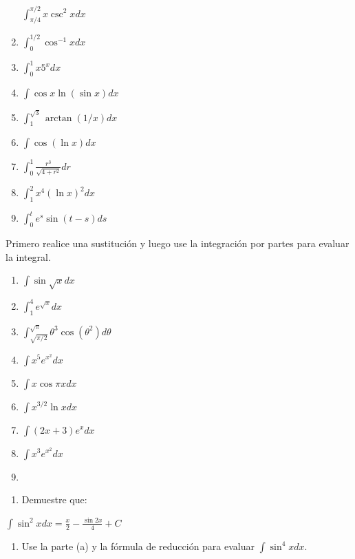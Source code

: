 \documentclass[12pt,]{article}
\providecommand{\tightlist}{%
  \setlength{\itemsep}{0pt}\setlength{\parskip}{0pt}}
\begin{document}
\begin{enumerate}
  \(\displaystyle\int_{\pi/4}^{\pi/2}x\csc^2xdx\)
\item
  \(\displaystyle\int_0^{1/2}\cos^{-1}x dx\)
\item
  \(\displaystyle\int_0^1x5^xdx\)
\item
  \(\displaystyle\int\cos x \ln(\sin x)dx\)
\item
  \(\displaystyle\int_1^{\sqrt{3}}\arctan(1/x)dx\)
\item
  \(\displaystyle\int\cos(\ln x)dx\)
\item
  \(\displaystyle\int_0^1\frac{r^3}{\sqrt{4+r^2}}dr\)
\item
  \(\displaystyle\int_1^2x^4(\ln x)^2dx\)
\item
  \(\displaystyle\int_0^te^s\sin(t-s)ds\)
\end{enumerate}

Primero realice una sustitución y luego use la integración por partes
para evaluar la integral.

\begin{enumerate}
\def\labelenumi{\arabic{enumi}.}
\setcounter{enumi}{32}
\item
  \(\displaystyle\int\sin\sqrt{x}dx\)
\item
  \(\displaystyle\int_1^4e^{\sqrt{x}}dx\)
\item
  \(\displaystyle\int_{\sqrt{\pi/2}}^{\sqrt{\pi}}\theta^3\cos(\theta^2)d\theta\)
\item
  \(\displaystyle\int x^5e^{x^2}dx\)
\item
  \(\displaystyle\int x\cos\pi xdx\)
\item
  \(\displaystyle\int x^{3/2}\ln x dx\)
\item
  \(\displaystyle\int(2x+3)e^x dx\)
\item
  \(\displaystyle\int x^3 e^{x^2} dx\)
\item
\end{enumerate}

\begin{enumerate}
\def\labelenumi{\alph{enumi}.}
\tightlist
\item
  Demuestre que:
\end{enumerate}

\(\displaystyle\int\sin^2xdx=\frac{x}{2}-\frac{\sin 2x}{4}+C\)

\begin{enumerate}
\def\labelenumi{\alph{enumi}.}
\setcounter{enumi}{1}
\tightlist
\item
  Use la parte (a) y la fórmula de reducción para evaluar
  \(\displaystyle\int \sin^4x dx.\)
\end{enumerate}
\end{document}
